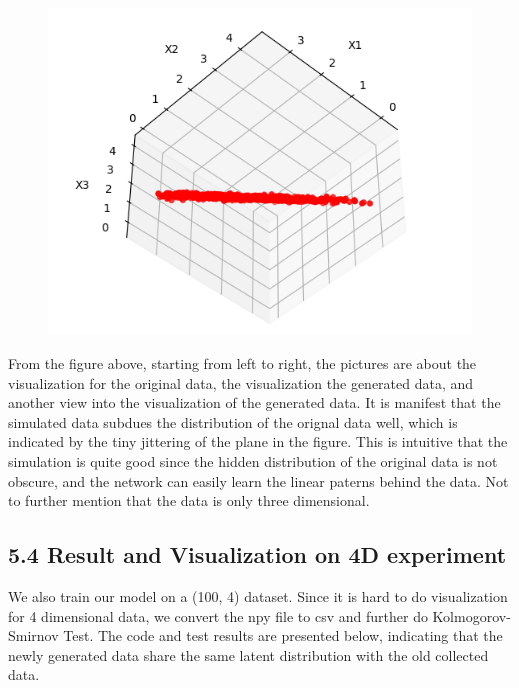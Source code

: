 \documentclass[11pt]{article}
\begin{document}
\begin{figure}[H]
\begin{minipage}{0.3\textwidth}
        \includegraphics[width=\textwidth]{image/dif_col_generated_2.png}
    \end{minipage}
\end{figure}

From the figure above, starting from left to right, the pictures are
about the visualization for the original data, the visualization the
generated data, and another view into the visualization of the generated
data. It is manifest that the simulated data subdues the distribution of
the orignal data well, which is indicated by the tiny jittering of the
plane in the figure. This is intuitive that the simulation is quite good
since the hidden distribution of the original data is not obscure, and
the network can easily learn the linear paterns behind the data. Not to
further mention that the data is only three dimensional.

    \subsection*{5.4 Result and Visualization on 4D experiment}\label{result-and-visualization-on-4d-experiment}

We also train our model on a (100, 4) dataset. Since it is hard to do
visualization for 4 dimensional data, we convert the npy file to csv and
further do Kolmogorov-Smirnov Test. The code and test results are
presented below, indicating that the newly generated data share the same
latent distribution with the old collected data.
\end{document}
